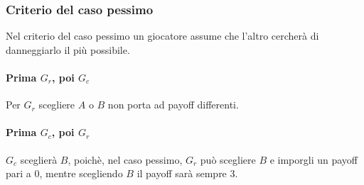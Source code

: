 \documentclass[\main/main.tex]{subfiles}
\begin{document}
\subsubsection*{Criterio del caso pessimo}
Nel criterio del caso pessimo un giocatore assume che l'altro cercherà di danneggiarlo il più possibile.
\paragraph*{Prima $G_r$, poi $G_c$}
Per $G_r$ scegliere $A$ o $B$ non porta ad payoff differenti.

\paragraph*{Prima $G_c$, poi $G_r$}
$G_c$ sceglierà $B$, poichè, nel caso pessimo, $G_r$ può scegliere $B$ e imporgli un payoff pari a $0$, mentre scegliendo $B$ il payoff sarà sempre $3$.
\end{document}
